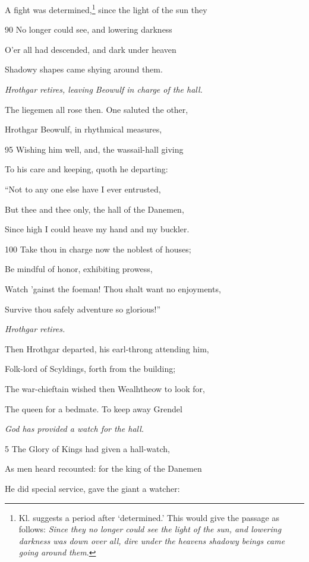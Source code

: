 A fight was determined,\footnote{Kl. suggests a period after ‘determined.’ This would give the passage
as follows: \emph{Since they no longer could see the light of the sun, and lowering
darkness was down over all, dire under the heavens shadowy beings came going
around them}.} since the light of the sun they

90
No longer could see, and lowering darkness

O’er all had descended, and dark under heaven

Shadowy shapes came shying around them.

\emph{Hrothgar retires,
leaving Beowulf in
charge of the hall.}

The liegemen all rose then. One saluted the other,

Hrothgar Beowulf, in rhythmical measures,

95
Wishing him well, and, the wassail-hall giving

To his care and keeping, quoth he departing:

“Not to any one else have I ever entrusted,

But thee and thee only, the hall of the Danemen,

Since high I could heave my hand and my buckler.

100
Take thou in charge now the noblest of houses;

Be mindful of honor, exhibiting prowess,

Watch ’gainst the foeman! Thou shalt want no enjoyments,

Survive thou safely adventure so glorious!”



\emph{Hrothgar retires.}

Then Hrothgar departed, his earl-throng attending him,

Folk-lord of Scyldings, forth from the building;

The war-chieftain wished then Wealhtheow to look for,

The queen for a bedmate. To keep away Grendel

\emph{God has provided
a watch for the
hall.}

5
The Glory of Kings had given a hall-watch,

As men heard recounted: for the king of the Danemen

He did special service, gave the giant a watcher:

